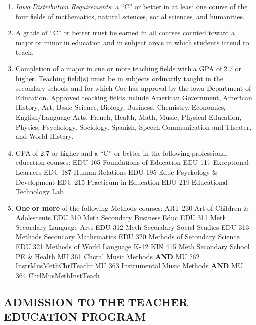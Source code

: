 \documentclass[
  letterpaper,
]{scrbook}
\providecommand{\tightlist}{%
  \setlength{\itemsep}{0pt}\setlength{\parskip}{0pt}}
\begin{document}
\begin{enumerate}
\def\labelenumi{\arabic{enumi}.}
\tightlist
\item
  \emph{Iowa Distribution Requirements}: a ``C'' or better in at least
  one course of the four fields of mathematics, natural sciences, social
  sciences, and humanities.
\item
  A grade of ``C'' or better must be earned in all courses counted
  toward a major or minor in education and in subject areas in which
  students intend to teach.
\item
  Completion of a major in one or more teaching fields with a GPA of 2.7
  or higher. Teaching field(s) must be in subjects ordinarily taught in
  the secondary schools and for which Coe has approval by the Iowa
  Department of Education. Approved teaching fields include American
  Government, American History, Art, Basic Science, Biology, Business,
  Chemistry, Economics, English/Language Arts, French, Health, Math,
  Music, Physical Education, Physics, Psychology, Sociology, Spanish,
  Speech Communication and Theater, and World History.
\item
  GPA of 2.7 or higher and a ``C'' or better in the following
  professional education courses: EDU 105 Foundations of Education EDU
  117 Exceptional Learners EDU 187 Human Relations EDU 195 Educ
  Psychology \& Development EDU 215 Practicum in Education EDU 219
  Educational Technology Lab
\item
  \textbf{One or more} of the following Methods courses: ART 230 Art of
  Children \& Adolescents EDU 310 Meth Secondary Business Educ EDU 311
  Meth Secondary Language Arts EDU 312 Meth Secondary Social Studies EDU
  313 Methods Secondary Mathematics EDU 320 Methods of Secondary Science
  EDU 321 Methods of World Language K-12 KIN 415 Meth Secondary School
  PE \& Health MU 361 Choral Music Methods \textbf{AND} MU 362
  InstrMusMethChrlTeachr MU 363 Instrumental Music Methods \textbf{AND}
  MU 364 ChrlMusMethInstTeach
\end{enumerate}

\hypertarget{admission-to-the-teacher-education-program}{%
\subsection{ADMISSION TO THE TEACHER EDUCATION
PROGRAM}\label{admission-to-the-teacher-education-program}}
\end{document}
